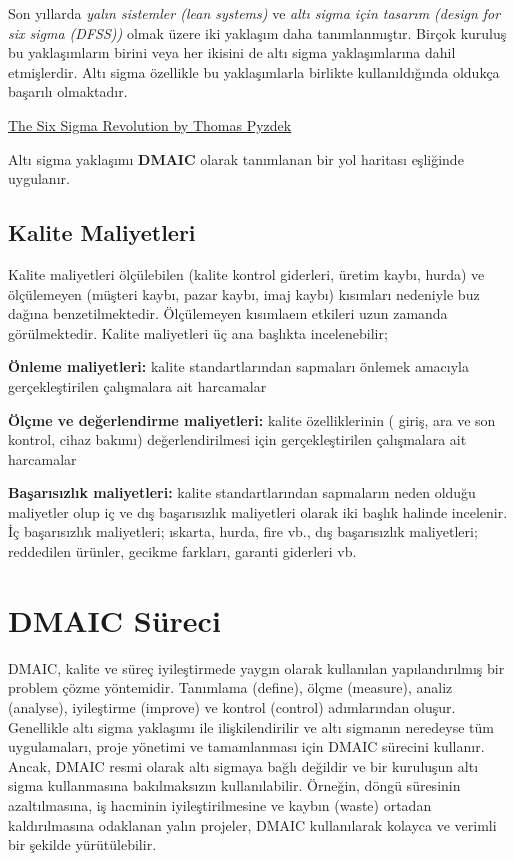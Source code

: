 \documentclass[
]{book}
\begin{document}
Son yıllarda \emph{yalın sistemler (lean systems)} ve \emph{altı sigma için tasarım (design for six sigma (DFSS))} olmak üzere iki yaklaşım daha tanımlanmıştır. Birçok kuruluş bu yaklaşımların birini veya her ikisini de altı sigma yaklaşımlarına dahil etmişlerdir. Altı sigma özellikle bu yaklaşımlarla birlikte kullanıldığında oldukça başarılı olmaktadır.

\href{http://www.bxlnc.com/download/The-Six-Sigma-Revolution.pdf}{The Six Sigma Revolution by Thomas Pyzdek}

Altı sigma yaklaşımı \textbf{DMAIC} olarak tanımlanan bir yol haritası eşliğinde uygulanır.

\hypertarget{kalite-maliyetleri}{%
\section{Kalite Maliyetleri}\label{kalite-maliyetleri}}

Kalite maliyetleri ölçülebilen (kalite kontrol giderleri, üretim kaybı, hurda) ve ölçülemeyen (müşteri kaybı, pazar kaybı, imaj kaybı) kısımları nedeniyle buz dağına benzetilmektedir. Ölçülemeyen kısımlaeın etkileri uzun zamanda görülmektedir. Kalite maliyetleri üç ana başlıkta incelenebilir;

\textbf{Önleme maliyetleri:} kalite standartlarından sapmaları önlemek amacıyla gerçekleştirilen çalışmalara ait harcamalar

\textbf{Ölçme ve değerlendirme maliyetleri:} kalite özelliklerinin ( giriş, ara ve son kontrol, cihaz bakımı) değerlendirilmesi için gerçekleştirilen çalışmalara ait harcamalar

\textbf{Başarısızlık maliyetleri:} kalite standartlarından sapmaların neden olduğu maliyetler olup iç ve dış başarısızlık maliyetleri olarak iki başlık halinde incelenir. İç başarısızlık maliyetleri; ıskarta, hurda, fire vb., dış başarısızlık maliyetleri; reddedilen ürünler, gecikme farkları, garanti giderleri vb.

\hypertarget{dmaic-suxfcreci}{%
\chapter{DMAIC Süreci}\label{dmaic-suxfcreci}}

DMAIC, kalite ve süreç iyileştirmede yaygın olarak kullanılan yapılandırılmış bir problem çözme yöntemidir. Tanımlama (define), ölçme (measure), analiz (analyse), iyileştirme (improve) ve kontrol (control) adımlarından oluşur. Genellikle altı sigma yaklaşımı ile ilişkilendirilir ve altı sigmanın neredeyse tüm uygulamaları, proje yönetimi ve tamamlanması için DMAIC sürecini kullanır. Ancak, DMAIC resmi olarak altı sigmaya bağlı değildir ve bir kuruluşun altı sigma kullanmasına bakılmaksızın kullanılabilir. Örneğin, döngü süresinin azaltılmasına, iş hacminin iyileştirilmesine ve kaybın (waste) ortadan kaldırılmasına odaklanan yalın projeler, DMAIC kullanılarak kolayca ve verimli bir şekilde yürütülebilir.
\end{document}
